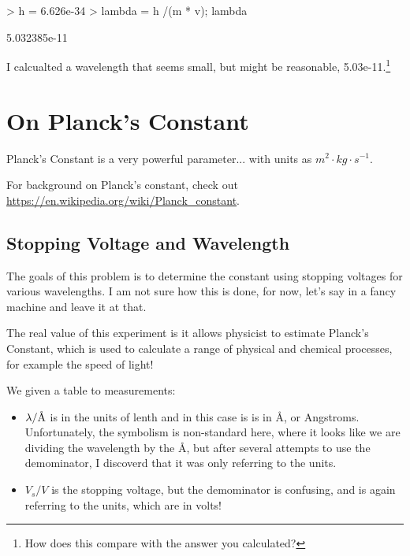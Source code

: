 \documentclass{article}
\newcommand{\angstrom}{\textup{\AA}}
\begin{document}
\begin{Schunk}
\begin{Sinput}
> h = 6.626e-34
> lambda = h /(m * v); lambda
\end{Sinput}
\begin{Soutput}
[1] 5.032385e-11
\end{Soutput}
\end{Schunk}

I calcualted a wavelength that seems small, but might be reasonable, 5.03e-11.\footnote{How does this compare with the answer you calculated?}

\section{On Planck's Constant}

Planck's Constant is a very powerful parameter... with units as $m^2 \cdot kg \cdot s^{-1}$. 

For background on Planck's constant, check out \url{https://en.wikipedia.org/wiki/Planck_constant}. 

\subsection{Stopping Voltage and Wavelength}

The goals of this problem is to determine the constant using stopping voltages for various wavelengths. I am not sure how this is done, for now, let's say in a fancy machine and leave it at that.

The real value of this experiment is it allows physicist to estimate Planck's Constant, which is used to calculate a range of physical and chemical processes, for example the speed of light!

We given a table to measurements: 
\begin{itemize}
\item $\lambda/\angstrom$ is in the units of lenth and in this case is is in \angstrom, or Angstroms. Unfortunately, the symbolism is non-standard here, where it looks like we are dividing the wavelength by the \angstrom, but after several attempts to use the demominator, I discoverd that it was only referring to the units. 

\item $V_s/V$ is the stopping voltage, but the demominator is confusing, and is again referring to the units, which are in volts!
\end{itemize}
\end{document}
